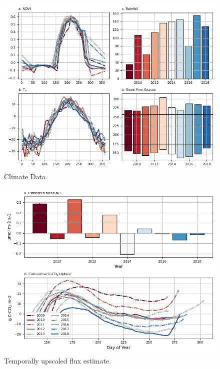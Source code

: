 \documentclass[
]{book}
\begin{document}
\begin{figure}
\includegraphics[width=1\linewidth]{images/16-fig4} \caption{Climate Data.}\label{fig:16-fig4}
\end{figure}

\begin{figure}
\includegraphics[width=1\linewidth]{images/16-fig5} \caption{Temporally upscaled flux estimate.}\label{fig:16-fig5}
\end{figure}
\end{document}
